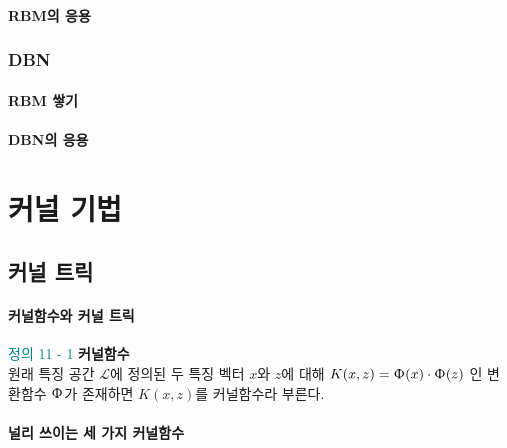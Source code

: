 \documentclass [12pt] {oblivoir}
\let\oldsubsubsection=\subsubsection
\renewcommand{\subsubsection}
{
  \filbreak
  \oldsubsubsection
}
\begin{document}
\paragraph*{RBM의 응용}\mbox{}

\vspace{3mm}

\subsubsection{DBN}

\paragraph*{RBM 쌓기}\mbox{}

\vspace{3mm}

\paragraph*{DBN의 응용}\mbox{}

\vspace{3mm}

\newpage
\section{커널 기법}

\subsection{커널 트릭}

\paragraph*{커널함수와 커널 트릭}\mbox{}
\vspace{3mm}

\begin{mdframed}
  \textcolor{teal}{정의 11 - 1} \textbf{커널함수} \\
  원래 특징 공간
  $\mathcal{L}$에 정의된 두 특징 벡터 $x$와 $z$에 대해 $K(x, z) = \Upphi(x) \cdot \Upphi(z)$
  인 변환함수 $\Upphi$가 존재하면 $K(x, z)$를 커널함수라 부른다.
\end{mdframed}

\paragraph*{널리 쓰이는 세 가지 커널함수}\mbox{}
\end{document}
